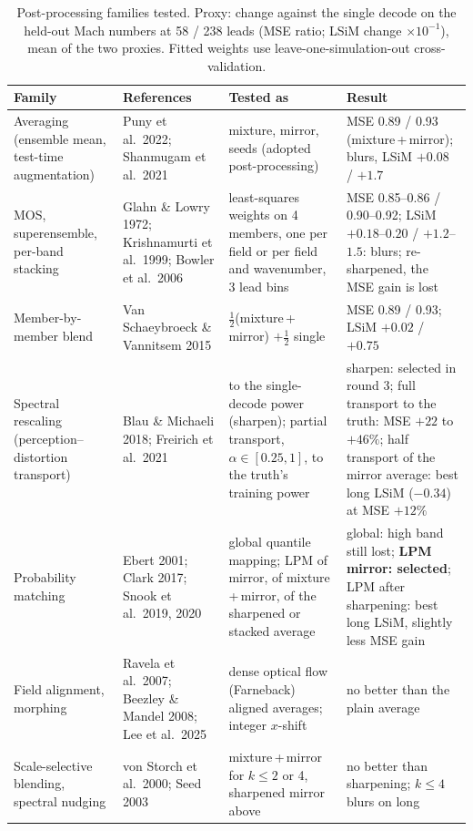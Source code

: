 \documentclass[10pt]{article}
\begin{document}
\begin{table}[!htbp]
\centering\scriptsize
\caption{Post-processing families tested. Proxy: change against the single decode on the
held-out Mach numbers at 58 / 238 leads (MSE ratio; LSiM change $\times10^{-1}$), mean of the two
proxies. Fitted weights use leave-one-simulation-out cross-validation.}
\label{tab:lit}
\setlength{\tabcolsep}{3pt}
\begin{tabular}{>{\raggedright\arraybackslash}p{3.0cm}>{\raggedright\arraybackslash}p{3.6cm}>{\raggedright\arraybackslash}p{4.4cm}>{\raggedright\arraybackslash}p{5.3cm}}
\toprule
Family & References & Tested as & Result\\
\midrule
Averaging (ensemble mean, test-time augmentation) & Puny et al.\ 2022; Shanmugam et al.\ 2021 & mixture, mirror, seeds (adopted post-processing) & MSE 0.89 / 0.93 (mixture\,+\,mirror); blurs, LSiM $+0.08$ / $+1.7$\\
MOS, superensemble, per-band stacking & Glahn \& Lowry 1972; Krishnamurti et al.\ 1999; Bowler et al.\ 2006 & least-squares weights on 4 members, one per field or per field and wavenumber, 3 lead bins & MSE 0.85--0.86 / 0.90--0.92; LSiM $+0.18$--$0.20$ / $+1.2$--$1.5$: blurs; re-sharpened, the MSE gain is lost\\
Member-by-member blend & Van Schaeybroeck \& Vannitsem 2015 & $\tfrac12$(mixture\,+\,mirror) $+ \tfrac12$ single & MSE 0.89 / 0.93; LSiM $+0.02$ / $+0.75$\\
Spectral rescaling (perception--distortion transport) & Blau \& Michaeli 2018; Freirich et al.\ 2021 & to the single-decode power (sharpen); partial transport, $\alpha\in[0.25,1]$, to the truth's training power & sharpen: selected in round 3; full transport to the truth: MSE $+22$ to $+46\%$; half transport of the mirror average: best long LSiM ($-0.34$) at MSE $+12\%$\\
Probability matching & Ebert 2001; Clark 2017; Snook et al.\ 2019, 2020 & global quantile mapping; LPM of mirror, of mixture\,+\,mirror, of the sharpened or stacked average & global: high band still lost; \textbf{LPM mirror: selected}; LPM after sharpening: best long LSiM, slightly less MSE gain\\
Field alignment, morphing & Ravela et al.\ 2007; Beezley \& Mandel 2008; Lee et al.\ 2025 & dense optical flow (Farneback) aligned averages; integer $x$-shift & no better than the plain average\\
Scale-selective blending, spectral nudging & von Storch et al.\ 2000; Seed 2003 & mixture\,+\,mirror for $k\le2$ or 4, sharpened mirror above & no better than sharpening; $k\le4$ blurs on long\\

\end{tabular}
\end{table}
\end{document}
